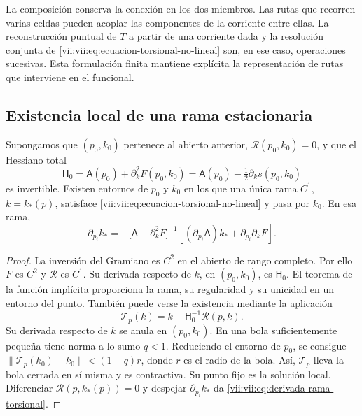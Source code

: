 La composición conserva la conexión en los dos miembros. Las rutas
que recorren varias celdas pueden acoplar las componentes de la
corriente entre ellas. La reconstrucción puntual de \(T\) a partir
de una corriente dada y la resolución conjunta de
\eqref{vii:vii:eq:ecuacion-torsional-no-lineal} son, en ese caso,
operaciones sucesivas. Esta formulación finita mantiene explícita
la representación de rutas que interviene en el funcional.

\subsection{Existencia local de una rama estacionaria}
\label{vii:vii:subsec:rama-torsional-local}

\begin{theorem}
\label{vii:vii:thm:rama-torsional-local}
Supongamos que \((p_0,k_0)\) pertenece al abierto anterior,
\(\mathcal R(p_0,k_0)=0\), y que el Hessiano total
\begin{equation}
 \mathsf H_0
 =\mathsf A(p_0)+\partial_k^2F(p_0,k_0)
 =\mathsf A(p_0)-\tfrac12\partial_ks(p_0,k_0)
 \label{vii:vii:eq:hessiano-total-torsional}
\end{equation}
es invertible. Existen entornos de \(p_0\) y \(k_0\) en los que
una única rama \(C^1\), \(k=k_*(p)\), satisface
\eqref{vii:vii:eq:ecuacion-torsional-no-lineal} y pasa por \(k_0\).
En esa rama,
\begin{equation}
 \partial_{p_i}k_*
 =-\bigl[\mathsf A+\partial_k^2F\bigr]^{-1}
     \left[(\partial_{p_i}\mathsf A)k_*
                      +\partial_{p_i}\partial_kF\right].
 \label{vii:vii:eq:derivada-rama-torsional}
\end{equation}
\end{theorem}

\begin{proof}
La inversión del Gramiano es \(C^2\) en el abierto de rango
completo. Por ello \(F\) es \(C^2\) y \(\mathcal R\) es
\(C^1\). Su derivada respecto de \(k\), en \((p_0,k_0)\), es
\(\mathsf H_0\). El teorema de la función implícita proporciona
la rama, su regularidad y su unicidad en un entorno del punto.
También puede verse la existencia mediante la aplicación
\[
 \mathcal T_p(k)=k-\mathsf H_0^{-1}\mathcal R(p,k).
\]
Su derivada respecto de \(k\) se anula en \((p_0,k_0)\).
En una bola suficientemente pequeña tiene norma a lo sumo
\(q<1\). Reduciendo el entorno de \(p_0\), se consigue
\(\|\mathcal T_p(k_0)-k_0\|<(1-q)r\), donde \(r\) es el
radio de la bola. Así, \(\mathcal T_p\) lleva la bola cerrada
en sí misma y es contractiva. Su punto fijo es la solución local.
Diferenciar \(\mathcal R(p,k_*(p))=0\) y despejar
\(\partial_{p_i}k_*\) da
\eqref{vii:vii:eq:derivada-rama-torsional}.
\end{proof}

